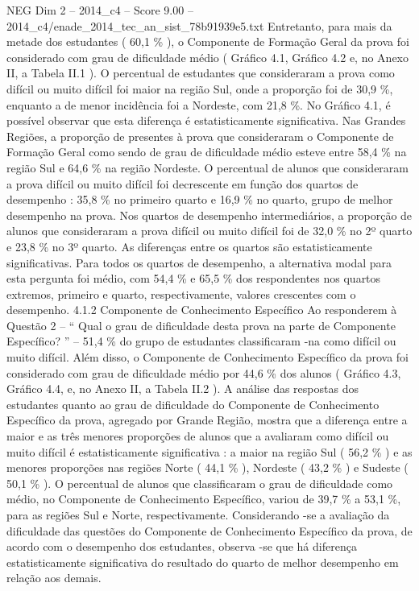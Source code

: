 \begin{textsample}{NEG Dim 2 – 2014\_c4 – Score 9.00 – 2014\_c4/enade\_2014\_tec\_an\_sist\_78b91939e5.txt}
Entretanto, para mais da metade dos estudantes ( 60,1 \% ), o Componente de Formação Geral da prova foi considerado com grau de dificuldade médio ( Gráfico 4.1, Gráfico 4.2 e, no Anexo II, a Tabela II.1 ).
O percentual de estudantes que consideraram a prova como difícil ou muito difícil foi maior na região Sul, onde a proporção foi de 30,9 \%, enquanto a de menor incidência foi a Nordeste, com 21,8 \%.
No Gráfico 4.1, é possível observar que esta diferença é estatisticamente significativa.
Nas Grandes Regiões, a proporção de presentes à prova que consideraram o Componente de Formação Geral como sendo de grau de dificuldade médio esteve entre 58,4 \% na região Sul e 64,6 \% na região Nordeste.
O percentual de alunos que consideraram a prova difícil ou muito difícil foi decrescente em função dos quartos de desempenho : 35,8 \% no primeiro quarto e 16,9 \% no quarto, grupo de melhor desempenho na prova.
Nos quartos de desempenho intermediários, a proporção de alunos que consideraram a prova difícil ou muito difícil foi de 32,0 \% no 2º quarto e 23,8 \% no 3º quarto.
As diferenças entre os quartos são estatisticamente significativas.
Para todos os quartos de desempenho, a alternativa modal para esta pergunta foi médio, com 54,4 \% e 65,5 \% dos respondentes nos quartos extremos, primeiro e quarto, respectivamente, valores crescentes com o desempenho. 4.1.2 Componente de Conhecimento Específico Ao responderem à Questão 2 – “ Qual o grau de dificuldade desta prova na parte de Componente Específico? ” – 51,4 \% do grupo de estudantes classificaram -na como difícil ou muito difícil.
Além disso, o Componente de Conhecimento Específico da prova foi considerado com grau de dificuldade médio por 44,6 \% dos alunos ( Gráfico 4.3, Gráfico 4.4, e, no Anexo II, a Tabela II.2 ).
A análise das respostas dos estudantes quanto ao grau de dificuldade do Componente de Conhecimento Específico da prova, agregado por Grande Região, mostra que a diferença entre a maior e as três menores proporções de alunos que a avaliaram como difícil ou muito difícil é estatisticamente significativa : a maior na região Sul ( 56,2 \% ) e as menores proporções nas regiões Norte ( 44,1 \% ), Nordeste ( 43,2 \% ) e Sudeste ( 50,1 \% ).
O percentual de alunos que classificaram o grau de dificuldade como médio, no Componente de Conhecimento Específico, variou de 39,7 \% a 53,1 \%, para as regiões Sul e Norte, respectivamente.
Considerando -se a avaliação da dificuldade das questões do Componente de Conhecimento Específico da prova, de acordo com o desempenho dos estudantes, observa -se que há diferença estatisticamente significativa do resultado do quarto de melhor desempenho em relação aos demais.

\end{textsample}
